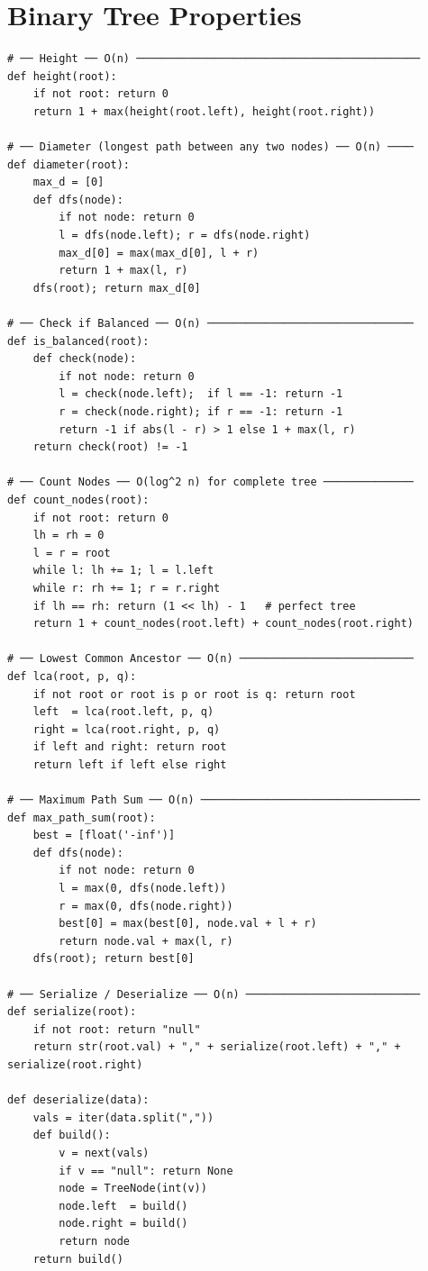 \documentclass[11pt,a4paper]{report}
\begin{document}
\section{Binary Tree Properties}

\begin{lstlisting}
# ── Height ── O(n) ────────────────────────────────────────────
def height(root):
    if not root: return 0
    return 1 + max(height(root.left), height(root.right))

# ── Diameter (longest path between any two nodes) ── O(n) ────
def diameter(root):
    max_d = [0]
    def dfs(node):
        if not node: return 0
        l = dfs(node.left); r = dfs(node.right)
        max_d[0] = max(max_d[0], l + r)
        return 1 + max(l, r)
    dfs(root); return max_d[0]

# ── Check if Balanced ── O(n) ────────────────────────────────
def is_balanced(root):
    def check(node):
        if not node: return 0
        l = check(node.left);  if l == -1: return -1
        r = check(node.right); if r == -1: return -1
        return -1 if abs(l - r) > 1 else 1 + max(l, r)
    return check(root) != -1

# ── Count Nodes ── O(log^2 n) for complete tree ────────────── 
def count_nodes(root):
    if not root: return 0
    lh = rh = 0
    l = r = root
    while l: lh += 1; l = l.left
    while r: rh += 1; r = r.right
    if lh == rh: return (1 << lh) - 1   # perfect tree
    return 1 + count_nodes(root.left) + count_nodes(root.right)

# ── Lowest Common Ancestor ── O(n) ───────────────────────────
def lca(root, p, q):
    if not root or root is p or root is q: return root
    left  = lca(root.left, p, q)
    right = lca(root.right, p, q)
    if left and right: return root
    return left if left else right

# ── Maximum Path Sum ── O(n) ──────────────────────────────────
def max_path_sum(root):
    best = [float('-inf')]
    def dfs(node):
        if not node: return 0
        l = max(0, dfs(node.left))
        r = max(0, dfs(node.right))
        best[0] = max(best[0], node.val + l + r)
        return node.val + max(l, r)
    dfs(root); return best[0]

# ── Serialize / Deserialize ── O(n) ───────────────────────────
def serialize(root):
    if not root: return "null"
    return str(root.val) + "," + serialize(root.left) + "," + serialize(root.right)

def deserialize(data):
    vals = iter(data.split(","))
    def build():
        v = next(vals)
        if v == "null": return None
        node = TreeNode(int(v))
        node.left  = build()
        node.right = build()
        return node
    return build()


\end{lstlisting}
\end{document}
